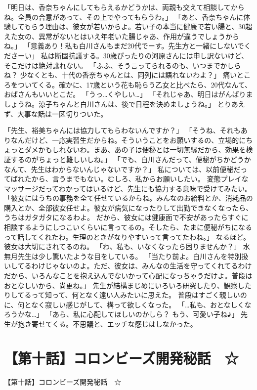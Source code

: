 「明日は、香奈ちゃんにしてもらえるかどうかは、両親も交えて相談してからね。全員の合意があって、その上でやってもらうわ。」
「あと、香奈ちゃんに体験してもらう理由は、彼女が若いからよ。若い子の本当に健康で若い腸と、30超えた女の、異常がないとはいえ年老いた腸じゃあ、作用が違うでしょうからね。」
「意義あり！私も白川さんもまだ20代でーす。先生方と一緒にしないでくださーい」
私は断固抗議する。30歳ぴったりの河原さんには申し訳ないけど、そこだけは絶対譲れない。
「ふふ、そう言ってられるのも、いつまでかしらね？ 少なくとも、十代の香奈ちゃんとは、同列には語れないわよ？」
痛いところをついてくる。確かに、17歳という花も恥らう乙女と比べたら、20代なんて、おばさんもいいとこだ。
「うっ…くやしい…」
「それじゃあ、明日はがんばりましょうね。涼子ちゃんと白川さんは、後で日程を決めましょうね。」
とりあえず、大事な話は一区切りついた。

「先生、裕美ちゃんには協力してもらわないんですか？」
「そうね、それもありなんだけど、一応実習生だからね。そういうことをお願いするの、立場的にちょっとダメかもしれないわ。まあ、あの子は便秘とは一切無縁だから、効果を検証するのがちょっと難しいしね。」
「でも、白川さんだって、便秘がちかどうかなんて、先生はわからないんじゃないですか？」
私については、以前便秘だってばれたから、言うまでもない。むしろ、私からお願いしたい。
変態プレイなマッサージだってわかってはいるけど、先生にも協力する意味で受けてみたい。
「彼女にはうちの事務を全て任せているからね。みんなのお給料とか、消耗品の購入とか、全部彼女任せよ。彼女が病気になったりして出勤できなくなったら、うちはガタガタになるわよ。
だから、彼女には健康面で不安があったらすぐに相談するようにしつこいくらいに言ってるの。そしたら、たまに便秘がちになるって話してくれたわ。生理のときがなりやすいって言ってたわね。」
なるほど。彼女は大切にされてるのね。
「わ、私も、いなくなったら困りませんか？」
水無月先生は少し驚いたような目をしている。
「当たり前よ。白川さんを特別扱いしてるわけじゃないのよ。ただ、彼女は、みんなの生活を守ってくれてるわけだから、いろんなことを抱え込んでないかって心配になっちゃうだけよ。普段はおとなしいから、尚更ね。」
先生が結構まじめにいろいろ研究したり、観察したりしてるって知って、何となく遠い人みたいに思えた。
普段はすごく親しいのに、何となく寂しい感じがして、構って欲しくなった。
「…私も、おとなしくなろうかな…」
「あら、私に心配してほしいのかしら？ もう、可愛い子ね♪」
先生が抱き寄せてくる。不思議と、エッチな感じはしなかった。


\section{【第十話】コロンビーズ開発秘話　☆}
【第十話】コロンビーズ開発秘話　☆



